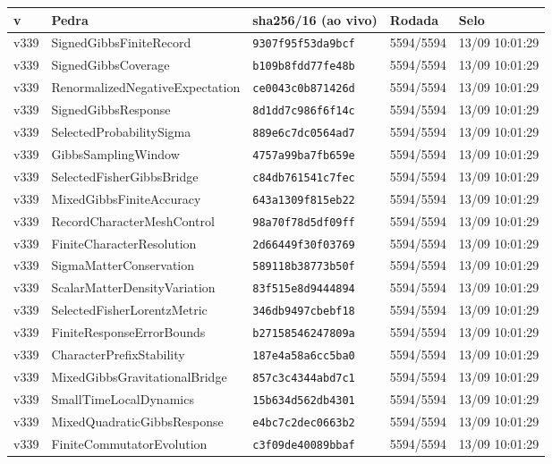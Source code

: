 \documentclass[11pt]{article}
\theoremstyle{definition}\newtheorem{deriv}{Derivação}
\begin{document}
{\small\begin{longtable}{@{}lllll@{}}\toprule v & Pedra & sha256/16 (ao vivo) & Rodada & Selo \\ \midrule\endhead 
v339 & SignedGibbsFiniteRecord & \texttt{9307f95f53da9bcf} & 5594/5594 & 13/09 10:01:29 \\
v339 & SignedGibbsCoverage & \texttt{b109b8fdd77fe48b} & 5594/5594 & 13/09 10:01:29 \\
v339 & RenormalizedNegativeExpectation & \texttt{ce0043c0b871426d} & 5594/5594 & 13/09 10:01:29 \\
v339 & SignedGibbsResponse & \texttt{8d1dd7c986f6f14c} & 5594/5594 & 13/09 10:01:29 \\
v339 & SelectedProbabilitySigma & \texttt{889e6c7dc0564ad7} & 5594/5594 & 13/09 10:01:29 \\
v339 & GibbsSamplingWindow & \texttt{4757a99ba7fb659e} & 5594/5594 & 13/09 10:01:29 \\
v339 & SelectedFisherGibbsBridge & \texttt{c84db761541c7fec} & 5594/5594 & 13/09 10:01:29 \\
v339 & MixedGibbsFiniteAccuracy & \texttt{643a1309f815eb22} & 5594/5594 & 13/09 10:01:29 \\
v339 & RecordCharacterMeshControl & \texttt{98a70f78d5df09ff} & 5594/5594 & 13/09 10:01:29 \\
v339 & FiniteCharacterResolution & \texttt{2d66449f30f03769} & 5594/5594 & 13/09 10:01:29 \\
v339 & SigmaMatterConservation & \texttt{589118b38773b50f} & 5594/5594 & 13/09 10:01:29 \\
v339 & ScalarMatterDensityVariation & \texttt{83f515e8d9444894} & 5594/5594 & 13/09 10:01:29 \\
v339 & SelectedFisherLorentzMetric & \texttt{346db9497cbebf18} & 5594/5594 & 13/09 10:01:29 \\
v339 & FiniteResponseErrorBounds & \texttt{b27158546247809a} & 5594/5594 & 13/09 10:01:29 \\
v339 & CharacterPrefixStability & \texttt{187e4a58a6cc5ba0} & 5594/5594 & 13/09 10:01:29 \\
v339 & MixedGibbsGravitationalBridge & \texttt{857c3c4344abd7c1} & 5594/5594 & 13/09 10:01:29 \\
v339 & SmallTimeLocalDynamics & \texttt{15b634d562db4301} & 5594/5594 & 13/09 10:01:29 \\
v339 & MixedQuadraticGibbsResponse & \texttt{e4bc7c2dec0663b2} & 5594/5594 & 13/09 10:01:29 \\
v339 & FiniteCommutatorEvolution & \texttt{c3f09de40089bbaf} & 5594/5594 & 13/09 10:01:29 \\

\end{longtable}}
\end{document}

